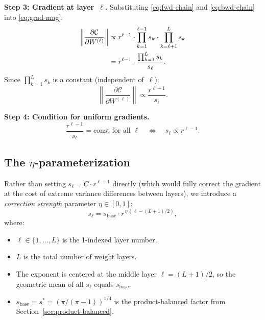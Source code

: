 \documentclass[11pt,a4paper]{article}
\theoremstyle{definition}
\begin{document}
\textbf{Step 3: Gradient at layer~$\ell$.}  Substituting
\eqref{eq:fwd-chain} and \eqref{eq:bwd-chain} into \eqref{eq:grad-mag}:
\begin{align}
  \left\|\frac{\partial\mathcal{C}}{\partial W^{(\ell)}}\right\|
  &\propto r^{\ell-1} \cdot \prod_{k=1}^{\ell-1} s_k
           \cdot \prod_{k=\ell+1}^{L} s_k \notag \\
  &= r^{\ell-1} \cdot \frac{\prod_{k=1}^{L} s_k}{s_\ell}. \label{eq:gradient-formula}
\end{align}
Since $\prod_{k=1}^L s_k$ is a constant (independent of~$\ell$):
\begin{equation}\label{eq:gradient-simple}
  \boxed{\;\left\|\frac{\partial\mathcal{C}}{\partial W^{(\ell)}}\right\|
  \propto \frac{r^{\ell-1}}{s_\ell}.\;}
\end{equation}

\textbf{Step 4: Condition for uniform gradients.}
\begin{equation}\label{eq:uniform-condition}
  \frac{r^{\ell-1}}{s_\ell} = \text{const for all } \ell
  \quad\Longleftrightarrow\quad
  s_\ell \propto r^{\ell-1}.
\end{equation}

\subsection{The $\eta$-parameterization}

Rather than setting $s_\ell = C \cdot r^{\ell-1}$ directly (which
would fully correct the gradient at the cost of extreme variance
differences between layers), we introduce a \emph{correction strength}
parameter $\eta \in [0, 1]$:
\begin{equation}\label{eq:eta-schedule}
  s_\ell = s_{\mathrm{base}} \cdot r^{\,\eta\,(\ell - (L+1)/2)},
\end{equation}
where:
\begin{itemize}[nosep]
  \item $\ell \in \{1, \ldots, L\}$ is the 1-indexed layer number.
  \item $L$ is the total number of weight layers.
  \item The exponent is centered at the middle layer $\ell = (L+1)/2$,
        so the geometric mean of all $s_\ell$ equals $s_{\mathrm{base}}$.
  \item $s_{\mathrm{base}} = s^{\ast} = (\pi/(\pi-1))^{1/4}$ is the
        product-balanced factor from Section~\ref{sec:product-balanced}.
\end{itemize}
\end{document}
